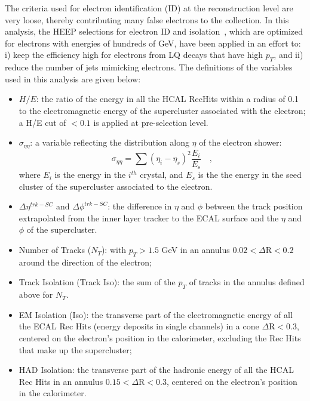 The criteria used for electron identification (ID) at the reconstruction level are very loose, thereby contributing many false electrons 
to the collection. In this analysis, the HEEP selections for electron ID and isolation~\cite{HEEPNOTE}, which are optimized for 
electrons with energies of hundreds of GeV, have been applied in an effort to: i) keep the efficiency high for electrons 
from LQ decays that have high $p_{T}$, and ii) reduce the number of jets mimicking electrons.
The definitions of the variables used in this analysis are given below:
%
\begin{itemize}
%
\item $H/E$: the ratio of the energy in all the HCAL RecHits within a radius of 0.1 to the electromagnetic energy of 
the supercluster associated with the electron; a H/E cut of $<0.1$ is applied at pre-selection level.
%
\item $\sigma_{\eta\eta}$: a variable reflecting the distribution along $\eta$ of the electron shower:
\begin{displaymath}
\sigma_{\eta\eta} = \sum( \eta_i - \eta_s )^2 \frac{E_i}{E_{\mbox{s}}} \quad ,
\end{displaymath}
where $E_i$ is the energy in the $i^{th}$ crystal, and $E_s$ is the the energy in the seed cluster of the supercluster associated to the electron.
%
\item $\Delta\eta^{trk-SC}$ and $\Delta\phi^{trk-SC}$: the difference in $\eta$ and $\phi$ between the track position extrapolated from 
the inner layer tracker to the ECAL surface and the $\eta$ and $\phi$ of the supercluster.
%
\item Number of Tracks ($N_T$): with $p_{T}>1.5$ GeV in an annulus $0.02 < \Delta\mbox{R} < 0.2 $ around the direction of the electron;
%
\item Track Isolation (Track Iso): the sum of the $p_{T}$ of tracks in the annulus defined above for $N_T$.
%
%
\item EM Isolation (Iso): the transverse part of the electromagnetic energy 
of all the ECAL Rec Hits (energy deposits in single channels)
in a cone $\Delta\mbox{R} < 0.3$, 
centered on the electron's position in the calorimeter, excluding the Rec Hits that make up the supercluster;
%
\item HAD Isolation: the transverse part of the hadronic energy of all the HCAL Rec Hits in an annulus
$0.15 < \Delta\mbox{R} < 0.3$, centered on the electron's position in the calorimeter. 
%
\end{itemize}

